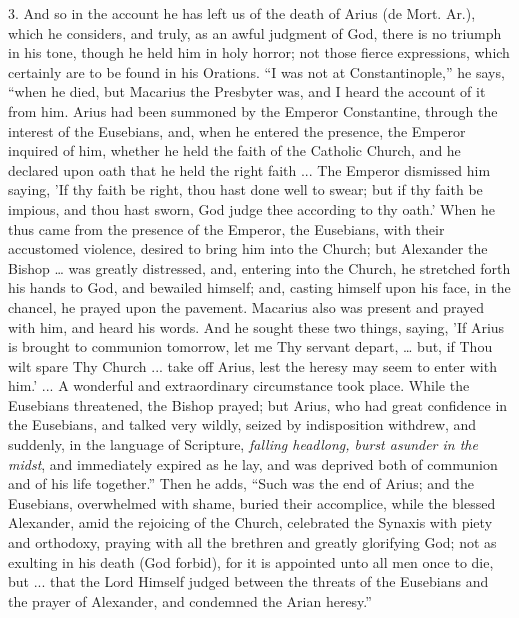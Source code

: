 3. And so in the account he has left us of the
death of Arius (de Mort. Ar.), which he considers, and truly, as an
awful judgment of God, there is no triumph in his tone, though he held
him in holy horror; not those fierce expressions, which certainly are
to be found in his Orations. ``I was not at Constantinople,'' he says, ``when
he died, but Macarius the Presbyter was, and I heard the account of it
from him. Arius had been summoned by the Emperor Constantine, through
the interest of the Eusebians, and, when he entered the presence, the
Emperor inquired of him, whether he held the faith of the Catholic
Church, and he declared upon oath that he held the right faith ... The
Emperor dismissed him saying, 'If thy faith be right, thou hast done
well to swear; but if thy faith be impious, and thou hast sworn, God
judge thee according to thy oath.' When he thus came from the presence
of the Emperor, the Eusebians, with their accustomed violence, desired
to bring him into the Church; but Alexander the Bishop … was greatly
distressed, and, entering into the Church, he stretched forth his
hands to God, and bewailed himself; and, casting himself upon his
face, in the chancel, he prayed upon the pavement. Macarius also was
present and prayed with him, and heard his words. And he sought these
two things, saying, 'If Arius is brought to communion tomorrow, let me
Thy servant depart, … but, if Thou wilt spare Thy Church ... take off
Arius, lest the heresy may seem to enter with him.' ... A wonderful
and extraordinary circumstance took place. While the Eusebians
threatened, the Bishop prayed; but Arius, who had great confidence in
the Eusebians, and talked very wildly, seized by indisposition
withdrew, and suddenly, in the language of Scripture, \emph{falling
headlong, burst asunder in the midst}, and immediately expired as
he lay, and was deprived both of communion and of his life together.''
Then he adds, ``Such was the end of Arius; and the Eusebians,
overwhelmed with shame, buried their accomplice, while the blessed
Alexander, amid the rejoicing of the Church, celebrated the Synaxis
with piety and orthodoxy, praying with all the brethren and greatly
glorifying God; not as exulting in his death (God forbid), for it is
appointed unto all men once to die, but ... that the Lord Himself
judged between the threats of the Eusebians and the prayer of
Alexander, and condemned the Arian heresy.''

